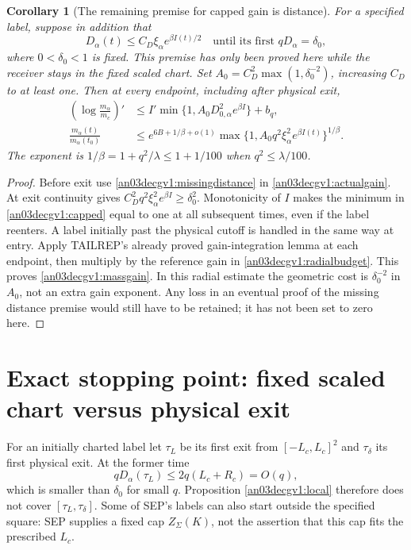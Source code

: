 \documentclass[11pt]{article}
\newtheorem{corollary}[proposition]{Corollary}
\theoremstyle{remark}\newtheorem{remark}[proposition]{Remark}
\begin{document}
\begin{corollary}[The remaining premise for capped gain is distance]
\label{an03decgv1:conditionalgain}
For a specified label, suppose in addition that
\begin{equation}
 D_\alpha(t)\le C_D\xi_\alpha e^{\beta I(t)/2}
 \quad\text{until its first }qD_\alpha=\delta_0,
 \label{an03decgv1:missingdistance}
\end{equation}
where $0<\delta_0<1$ is fixed. This premise has only been proved
here while the receiver stays in the fixed scaled chart.
Set $A_0=C_D^2\max(1,\delta_0^{-2})$, increasing $C_D$ to at
least one. Then at every endpoint, including after physical exit,
\begin{align}
 \left(\log\frac{m_\alpha}{m_c}\right)'
 &\le I'\min\{1,A_0D_{0,\alpha}^2e^{\beta I}\}+b_q,
 \label{an03decgv1:capped}\\
 \frac{m_\alpha(t)}{m_\alpha(t_0)}
 &\le e^{6B+1/\beta+o(1)}
       \max\{1,A_0q^2\xi_\alpha^2e^{\beta I(t)}\}^{1/\beta}.
 \label{an03decgv1:massgain}
\end{align}
The exponent is $1/\beta=1+q^2/\lambda\le1+1/100$ when
$q^2\le\lambda/100$.
\end{corollary}
\begin{proof}
Before exit use \eqref{an03decgv1:missingdistance} in
\eqref{an03decgv1:actualgain}. At exit continuity gives
$C_D^2q^2\xi_\alpha^2e^{\beta I}\ge\delta_0^2$.
Monotonicity of $I$ makes the minimum in
\eqref{an03decgv1:capped} equal to one at all subsequent times,
even if the label reenters. A label initially past the physical
cutoff is handled in the same way at entry.
Apply TAILREP's already proved gain-integration lemma at each
endpoint, then multiply by the reference gain in
\eqref{an03decgv1:radialbudget}. This proves
\eqref{an03decgv1:massgain}. In this radial estimate the geometric
cost is $\delta_0^{-2}$ in $A_0$, not an extra gain exponent.
Any loss in an eventual proof of the missing distance premise
would still have to be retained; it has not been set to zero here.
\end{proof}

\section{Exact stopping point: fixed scaled chart versus physical exit}
\label{an03decgv1:obstructionsection}
For an initially charted label let $\tau_L$ be its first exit
from $[-L_c,L_c]^2$ and $\tau_\delta$ its first physical exit.
At the former time
\[
 qD_\alpha(\tau_L)\le2q(L_c+R_c)=O(q),
\]
which is smaller than $\delta_0$ for small $q$. Proposition
\ref{an03decgv1:local} therefore does not cover
$[\tau_L,\tau_\delta]$. Some of SEP's labels can also start
outside the specified square: SEP supplies a fixed cap
$Z_\Sigma(K)$, not the assertion that this cap fits the prescribed
$L_c$.
\end{document}

